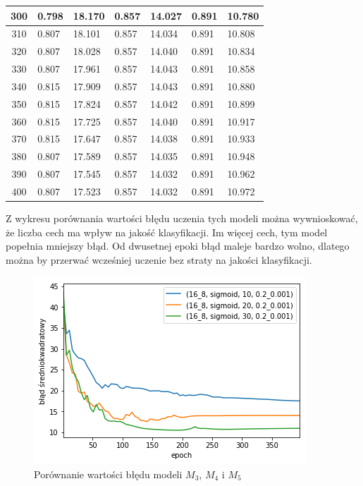 \begin{longtable}{|c|l|l|l|l|l|l|}
        300 & 0.798 & 18.170 & 0.857 & 14.027 & 0.891 & 10.780 \\ \hline
        310 & 0.807 & 18.101 & 0.857 & 14.034 & 0.891 & 10.808 \\ \hline
        320 & 0.807 & 18.028 & 0.857 & 14.040 & 0.891 & 10.834 \\ \hline
        330 & 0.807 & 17.961 & 0.857 & 14.043 & 0.891 & 10.858 \\ \hline
        340 & 0.815 & 17.909 & 0.857 & 14.043 & 0.891 & 10.880 \\ \hline
        350 & 0.815 & 17.824 & 0.857 & 14.042 & 0.891 & 10.899 \\ \hline
        360 & 0.815 & 17.725 & 0.857 & 14.040 & 0.891 & 10.917 \\ \hline
        370 & 0.815 & 17.647 & 0.857 & 14.038 & 0.891 & 10.933 \\ \hline
        380 & 0.807 & 17.589 & 0.857 & 14.035 & 0.891 & 10.948 \\ \hline
        390 & 0.807 & 17.545 & 0.857 & 14.032 & 0.891 & 10.962 \\ \hline
        400 & 0.807 & 17.523 & 0.857 & 14.032 & 0.891 & 10.972 \\ \hline
    \end{longtable}

    Z wykresu porównania wartości błędu uczenia tych modeli można wywnioskować, że liczba cech ma wpływ na jakość klasyfikacji.
    Im więcej cech, tym model popełnia mniejszy błąd.
    Od dwusetnej epoki błąd maleje bardzo wolno, dlatego można by przerwać wcześniej uczenie bez straty na jakości klasyfikacji.

    \begin{figure}[htp]
        \centering
        \includegraphics[scale=0.8]{./img/feat-error.png}
        \caption{Porównanie wartości błędu modeli $M_3$, $M_4$ i $M_5$}
    \end{figure}

